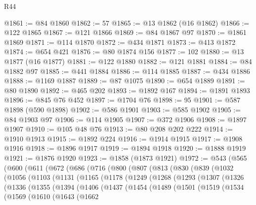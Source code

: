 \begin{lexlean}{R44}
\begin{coremodule}
@1861 := @84 @1860
@1862 := 57
@1865 := @13 @1862 (@16 @1862)
@1866 := @122 @1865
@1867 := @121 @1866
@1869 := @84 @1867 @97
@1870 := @1861 @1869
@1871 := @114 @1870
@1872 := @434 @1871
@1873 := @413 @1872
@1874 := @654 @421
@1876 := @80 @1874 @156
@1877 := 102
@1880 := @13 @1877 (@16 @1877)
@1881 := @122 @1880
@1882 := @121 @1881
@1884 := @84 @1882 @97
@1885 := @441 @1884
@1886 := @114 @1885
@1887 := @434 @1886
@1888 := @1169 @1887
@1889 := @87 @1075
@1890 := @654 @1889
@1891 := @80 @1890
@1892 := @465 @202
@1893 := @1892 @167
@1894 := @1891 @1893
@1896 := @845 @76 @452
@1897 := @1704 @76
@1898 := 95
@1901 := @587 @1898 (@590 @1898)
@1902 := @586 @1901
@1903 := @585 @1902
@1905 := @84 @1903 @97
@1906 := @114 @1905
@1907 := @372 @1906
@1908 := @1897 @1907
@1910 := @105 @48 @76
@1913 := @80 @208 @202 @222
@1914 := @1910 @1913
@1915 := @1892 @224
@1916 := @1914 @1915
@1917 := @1908 @1916
@1918 := @1896 @1917
@1919 := @1894 @1918
@1920 := @1888 @1919
@1921 := @1876 @1920
@1923 := @1858 (@1873 @1921)
@1972 := @543
    (@565
      (@600
        (@611
          (@672
            (@686
              (@716
                (@800
                  (@807
                    (@813
                      (@830
                        (@839
                          (@1032
                            (@1056
                              (@1103
                                (@1131
                                  (@1165
                                    (@1178
                                      (@1249
                                        (@1268
                                          (@1293
                                            (@1307
                                              (@1326
                                                (@1336
                                                  (@1355
                                                    (@1394
                                                      (@1406
                                                        (@1437
                                                          (@1454
                                                            (@1489
                                                              (@1501
                                                                (@1519
                                                                  (@1534
                                                                    (@1569
                                                                      (@1610
                                                                        (@1643
                                                                          (@1662

\end{coremodule}
\end{lexlean}
